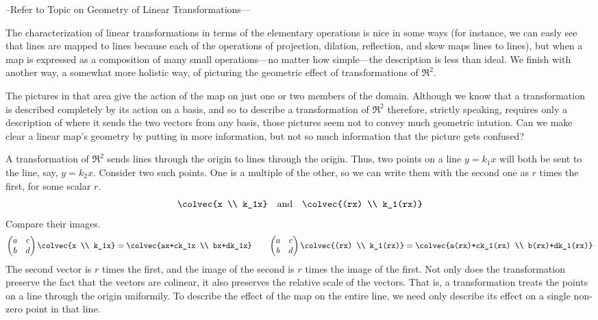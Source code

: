 --Refer to Topic on Geometry of Linear Transformations---

The characterization of linear transformations in terms of the 
elementary operations is nice in some ways (for instance, we can easly see that
lines are mapped to lines because each of the operations of 
projection, dilation, reflection, and skew maps lines to lines),
but when a map is expressed as a composition of many small operations---no
matter how simple---the description is less than ideal.
We finish with another way, a somewhat more holistic way,
of picturing the geometric effect of
transformations of $\Re^2$.

The pictures in that area give the action of the 
map on just one or two members of the domain.
Although we know that a transformation is described completely by its action
on a basis, and so to describe a transformation of
$\Re^2$ therefore, strictly speaking, 
requires only a description of where it sends the two vectors
from any basis, 
those pictures seem not to convey much geometric intution.
Can we make clear a linear map's geometry by putting in more 
information, but not so much information that the picture gets confused?

A transformation of $\Re^2$ sends lines through the origin to lines through
the origin.
Thus, two points on a line $y=k_1x$ will both be sent to the line,
say, $y=k_2x$.
Consider two such points.
One is a multiple of the other, so we can write them with the second one as 
$r$ times the first, for some scalar $r$.
\begin{equation*}
  \colvec{x \\ k_1x}\quad\mbox{and}\quad\colvec{(rx) \\ k_1(rx)}
\end{equation*}
Compare their images.
\begin{equation*}
  \begin{pmatrix}
    a  &c  \\
    b  &d
  \end{pmatrix}
  \colvec{x \\ k_1x}
  =
  \colvec{ax+ck_1x \\ bx+dk_1x}
  \qquad
  \begin{pmatrix}
    a  &c  \\
    b  &d
  \end{pmatrix}
  \colvec{(rx) \\ k_1(rx)}
  =
  \colvec{a(rx)+ck_1(rx) \\ b(rx)+dk_1(rx)}
\end{equation*}
The second vector is $r$ times the first, and the image of the 
second is $r$ times the image of the first.
Not only does the transformation preserve the fact that the vectors are
colinear, it also preserves the relative scale of the vectors.
That is, a transformation treats the points on a line through the origin
uniformily.
To describe the effect of the map on the entire line, we need only describe
its effect on a single non-zero point in that line.

